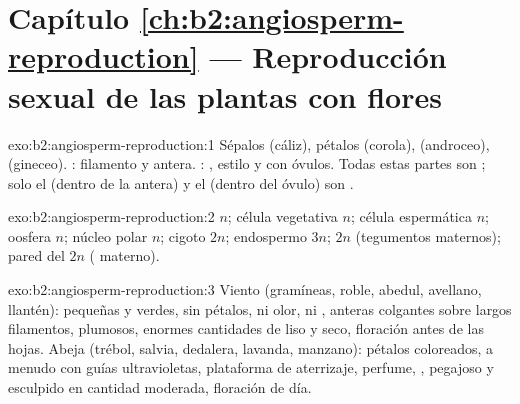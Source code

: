 \section*{Capítulo \ref{ch:b2:angiosperm-reproduction} --- Reproducción sexual de las plantas con flores}

\begin{solution}{exo:b2:angiosperm-reproduction:1}
Sépalos (cáliz), pétalos (corola),  (androceo), 
(gineceo). : filamento y antera. : , estilo y
 con óvulos. Todas estas partes son  ; solo el
 (dentro de la antera) y el  (dentro del
óvulo) son  .
\end{solution}

\begin{solution}{exo:b2:angiosperm-reproduction:2}
 $n$; célula vegetativa $n$; célula espermática $n$; oosfera
$n$; núcleo polar $n$; cigoto $2n$; endospermo $3n$; 
$2n$ (tegumentos maternos); pared del  $2n$ ( materno).
\end{solution}

\begin{solution}{exo:b2:angiosperm-reproduction:3}
Viento (gramíneas, roble, abedul, avellano, llantén):  pequeñas y
verdes, sin pétalos, ni olor, ni , anteras colgantes sobre largos
filamentos,  plumosos, enormes cantidades de  liso y seco,
floración antes de las hojas. Abeja (trébol, salvia, dedalera, lavanda,
manzano): pétalos coloreados, a menudo con guías ultravioletas,
plataforma de aterrizaje, perfume, ,  pegajoso y esculpido en
cantidad moderada, floración de día.
\end{solution}

